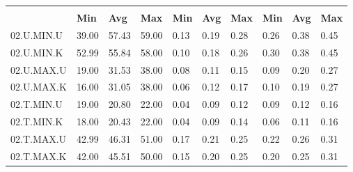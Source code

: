 \begin{tabular}{|>{\raggedright}p{}|>{\raggedright}p{}|>{\raggedright}p{}|>{\raggedright}p{}|>{\raggedright}p{}|>{\raggedright}p{}|>{\raggedright}p{}|>{\raggedright}p{}|>{\raggedright}p{}|>{\raggedright}p{}|}
\hline 
\multirow{2}{0.12\columnwidth}{\textbf{\footnotesize{}Bezeichnung}} & \multicolumn{3}{l|}{\textbf{\footnotesize{}CPU-Last {[}\%{]}}} & \multicolumn{3}{l|}{\textbf{\footnotesize{}Systemtime {[}s{]}}} & \multicolumn{3}{l|}{\textbf{\footnotesize{}Usertime {[}s{]}}}\tabularnewline
\cline{2-10} 
& \textbf{\footnotesize{}Min} & \textbf{\footnotesize{}Avg} & \textbf{\footnotesize{}Max} & \textbf{\footnotesize{}Min} & \textbf{\footnotesize{}Avg} & \textbf{\footnotesize{}Max} & \textbf{\footnotesize{}Min} & \textbf{\footnotesize{}Avg} & \textbf{\footnotesize{}Max}\tabularnewline
\hline 
\hline 
{\footnotesize{}02.U.MIN.U} & {\footnotesize{}39.00} & {\footnotesize{}57.43} & {\footnotesize{}59.00} & {\footnotesize{}0.13} & {\footnotesize{}0.19} & {\footnotesize{}0.28} & {\footnotesize{}0.26} & {\footnotesize{}0.38} & {\footnotesize{}0.45}\tabularnewline
\hline 
\hline 
{\footnotesize{}02.U.MIN.K} & {\footnotesize{}52.99} & {\footnotesize{}55.84} & {\footnotesize{}58.00} & {\footnotesize{}0.10} & {\footnotesize{}0.18} & {\footnotesize{}0.26} & {\footnotesize{}0.30} & {\footnotesize{}0.38} & {\footnotesize{}0.45}\tabularnewline
\hline 
\hline 
{\footnotesize{}02.U.MAX.U} & {\footnotesize{}19.00} & {\footnotesize{}31.53} & {\footnotesize{}38.00} & {\footnotesize{}0.08} & {\footnotesize{}0.11} & {\footnotesize{}0.15} & {\footnotesize{}0.09} & {\footnotesize{}0.20} & {\footnotesize{}0.27}\tabularnewline
\hline 
\hline 
{\footnotesize{}02.U.MAX.K} & {\footnotesize{}16.00} & {\footnotesize{}31.05} & {\footnotesize{}38.00} & {\footnotesize{}0.06} & {\footnotesize{}0.12} & {\footnotesize{}0.17} & {\footnotesize{}0.10} & {\footnotesize{}0.19} & {\footnotesize{}0.27}\tabularnewline
\hline 
\hline 
{\footnotesize{}02.T.MIN.U} & {\footnotesize{}19.00} & {\footnotesize{}20.80} & {\footnotesize{}22.00} & {\footnotesize{}0.04} & {\footnotesize{}0.09} & {\footnotesize{}0.12} & {\footnotesize{}0.09} & {\footnotesize{}0.12} & {\footnotesize{}0.16}\tabularnewline
\hline 
\hline 
{\footnotesize{}02.T.MIN.K} & {\footnotesize{}18.00} & {\footnotesize{}20.43} & {\footnotesize{}22.00} & {\footnotesize{}0.04} & {\footnotesize{}0.09} & {\footnotesize{}0.14} & {\footnotesize{}0.06} & {\footnotesize{}0.11} & {\footnotesize{}0.16}\tabularnewline
\hline 
\hline 
{\footnotesize{}02.T.MAX.U} & {\footnotesize{}42.99} & {\footnotesize{}46.31} & {\footnotesize{}51.00} & {\footnotesize{}0.17} & {\footnotesize{}0.21} & {\footnotesize{}0.25} & {\footnotesize{}0.22} & {\footnotesize{}0.26} & {\footnotesize{}0.31}\tabularnewline
\hline 
\hline 
{\footnotesize{}02.T.MAX.K} & {\footnotesize{}42.00} & {\footnotesize{}45.51} & {\footnotesize{}50.00} & {\footnotesize{}0.15} & {\footnotesize{}0.20} & {\footnotesize{}0.25} & {\footnotesize{}0.20} & {\footnotesize{}0.25} & {\footnotesize{}0.31}\tabularnewline
\hline 
\end{tabular}
\par
